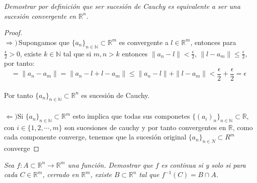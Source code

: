 \documentclass[11pt,letterpaper]{article}
\newcommand{\R}{\mathbb{R}}
\newcommand{\N}{\mathbb{N}}
\begin{document}
\begin{tcolorbox}[
  enhanced,
  colback=black,        %
  coltext=white,        %
  coltitle=black,       %
  colbacktitle=white,   %
  title={\textbf{Problema 3}},
   boxrule=2pt,          %
  colframe=white,  %
  arc=4pt,              %
  width=\linewidth
]
\textit{Demostrar por definición que ser sucesión de Cauchy es equivalente a ser una sucesión convergente en $\R^n$.}
\end{tcolorbox}
\begin{proof}\,\\
  $\Rightarrow )$\,Supongamos que $\{a_n\}_{n\in \N}\subset \R^m$ es convergente a $l\in \R^m$, entonces para $\frac{\epsilon}{2}>0$, existe $k\in \N$ tal que si $m,n>k$ entonces
  $\|a_n-l\|<\frac{\epsilon}{2}$, $\|l-a_m\|\leq \frac{\epsilon}{2}$, por tanto:\,\\
  \begin{equation*}
   =\|a_n-a_m\|= \|a_n-l+l-a_m\|\leq \|a_n-l\|+\|l-a_m\|<\frac{\epsilon}{2}+\frac{\epsilon}{2}=\epsilon
  \end{equation*}\,\\
  Por tanto $\{a_n\}_{n\in \N}\subset \R^n$ es sucesi\'on de Cauchy.\,\\
  \,\\
  $\Longleftarrow )$Si $\{a_n\}_{n\in \N}\subset \R^m$ esto implica que todas sus componetes $\{(a_{i})_n\}_{n \in \N }\subset \R$, con $i\in \{1,2,\cdots,m\}$ son sucesiones de cauchy y por tanto convergentes en $\R$, como cada componente converge, tenemos que la sucesi\'on original $\{a_n\}_{n\in N}\subset R^m$ converge

\end{proof}
\begin{tcolorbox}[
  enhanced,
  colback=black,        %
  coltext=white,        %
  coltitle=black,       %
  colbacktitle=white,   %
  title={\textbf{Problema 4}},
   boxrule=2pt,          %
  colframe=white,  %
  arc=4pt,              %
  width=\linewidth
]
\textit{Sea $f:A\subset \R^n\rightarrow \R^m$ una función. Demostrar que $f$ es continua si y solo si para cada $C\in\R^{m}$, cerrado en $\R^m$, existe $B\subset \R^n$ tal que $f^{-1}(C)=B\cap A$.}
\end{tcolorbox}
\end{document}
